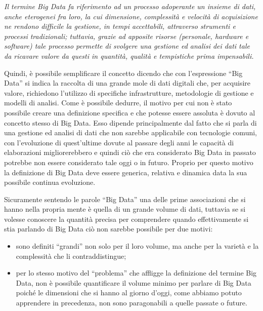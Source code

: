 \begin{center}
\textit{Il termine Big Data fa riferimento ad un processo adoperante un insieme di dati, anche eterogenei fra loro, la cui dimensione, complessità e velocità di acquisizione ne rendono difficile la gestione, in tempi accettabili, attraverso strumenti e processi tradizionali; tuttavia, grazie ad apposite risorse (personale, hardware e software) tale processo permette di svolgere una gestione ed analisi dei dati tale da ricavare valore da questi in quantità, qualità e tempistiche prima impensabili.}
\end{center}

Quindi, è possibile semplificare il concetto dicendo che con l'espressione “Big Data” si indica la raccolta di una grande mole di dati digitali che, per acquisire valore, richiedono l'utilizzo di specifiche infrastrutture, metodologie di gestione e modelli di analisi. Come è possibile dedurre, il motivo per cui non è stato possibile creare una definizione specifica e che potesse essere assoluta è dovuto al concetto stesso di Big Data. Esso dipende principalmente dal fatto che si parla di una gestione ed analisi di dati che non sarebbe applicabile con tecnologie comuni, con l'evoluzione di quest'ultime dovute al passare degli anni le capacità di elaborazioni migliorerebbero e quindi ciò che era considerato Big Data in passato potrebbe non essere considerato tale oggi o in futuro. Proprio per questo motivo la definizione di Big Data deve essere generica, relativa e dinamica data la sua possibile continua evoluzione.

Sicuramente sentendo le parole “Big Data” una delle prime associazioni che si hanno nella propria mente è quella di un grande volume di dati, tuttavia se si volesse conoscere la quantità precisa per comprendere quando effettivamente si stia parlando di Big Data ciò non sarebbe possibile per due motivi:

\begin{itemize}
    \item sono definiti “grandi” non solo per il loro volume, ma anche per la varietà e la complessità che li contraddistingue;
    \item per lo stesso motivo del “problema” che affligge la definizione del termine Big Data, non è possibile quantificare il volume minimo per parlare di Big Data poiché le dimensioni che si hanno al giorno d'oggi, come abbiamo potuto apprendere in precedenza, non sono paragonabili a quelle passate o future.
\end{itemize}

